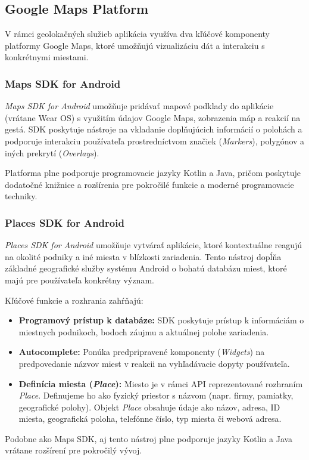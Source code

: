 \subsection{Google Maps Platform}
V rámci geolokačných služieb aplikácia využíva dva kľúčové komponenty platformy Google Maps, ktoré umožňujú vizualizáciu dát a interakciu s konkrétnymi miestami.

\subsubsection{Maps SDK for Android}
\textit{Maps SDK for Android} umožňuje pridávať mapové podklady do aplikácie (vrátane Wear OS) s využitím údajov Google Maps, zobrazenia máp a reakcií na gestá. SDK poskytuje nástroje na vkladanie doplňujúcich informácií o polohách a podporuje interakciu používateľa prostredníctvom značiek (\textit{Markers}), polygónov a iných prekrytí (\textit{Overlays}). 

Platforma plne podporuje programovacie jazyky Kotlin a Java, pričom poskytuje dodatočné knižnice a rozšírenia pre pokročilé funkcie a moderné programovacie techniky.

\subsubsection{Places SDK for Android}
\textit{Places SDK for Android} umožňuje vytvárať aplikácie, ktoré kontextuálne reagujú na okolité podniky a iné miesta v blízkosti zariadenia. Tento nástroj dopĺňa základné geografické služby systému Android o bohatú databázu miest, ktoré majú pre používateľa konkrétny význam.

Kľúčové funkcie a rozhrania zahŕňajú:
\begin{itemize}
    \item \textbf{Programový prístup k databáze:} SDK poskytuje prístup k informáciám o miestnych podnikoch, bodoch záujmu a aktuálnej polohe zariadenia.
    \item \textbf{Autocomplete:} Ponúka predpripravené komponenty (\textit{Widgets}) na predpovedanie názvov miest v reakcii na vyhľadávacie dopyty používateľa.
    \item \textbf{Definícia miesta (\textit{Place}):} Miesto je v rámci API reprezentované rozhraním \textit{Place}. Definujeme ho ako fyzický priestor s názvom (napr. firmy, pamiatky, geografické polohy). Objekt \textit{Place} obsahuje údaje ako názov, adresa, ID miesta, geografická poloha, telefónne číslo, typ miesta či webová adresa.
\end{itemize}
Podobne ako Maps SDK, aj tento nástroj plne podporuje jazyky Kotlin a Java vrátane rozšírení pre pokročilý vývoj.
